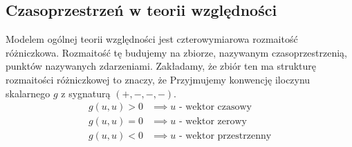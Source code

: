 \subsection{Czasoprzestrzeń w teorii względności}
Modelem ogólnej teorii względności jest czterowymiarowa 
rozmaitość różniczkowa. Rozmaitość tę budujemy na 
zbiorze, nazywanym czasoprzestrzenią, punktów nazywanych zdarzeniami. 
Zakładamy, że zbiór ten ma strukturę rozmaitości różniczkowej to znaczy, 
że 
Przyjmujemy konwencję iloczynu skalarnego $g$ z sygnaturą $(+,-,-,-)$.
\begin{align}
g(u,u) > 0& \implies u \text{ - wektor czasowy}\\
g(u,u) = 0& \implies u \text{ - wektor zerowy}\\
g(u,u) < 0& \implies u \text{ - wektor przestrzenny}
\end{align}
